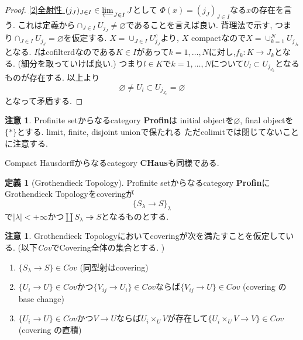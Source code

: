 \documentclass[dvipdfmx,a4paper,11pt]{report}
\theoremstyle{definition}
\newtheorem{dfn}[thm]{定義}
\newtheorem{rem}[thm]{注意}
\begin{document}
\begin{proof}
\underline{[2]全射性 }
$(j_{J})_{J \in I} \in \varprojlim_{J \in I} J$として
$\Phi(x) = (j_J)_{J \in I}$なる$x$の存在を言う.
これは定義から$\cap_{J \in I} U_{j_{J}} \neq \varnothing$であることを言えば良い.
背理法で示す, つまり$\cap_{J \in I} U_{j_{J}} = \varnothing$を仮定する.
$X = \cup_{J \in I} U_{j_{J}}^{c} $より, $X$ compactなので$X =\cup_{k=1}^{N}U_{j_{J_{k}}}$となる.
 $I$はcofilterdなのである$K \in I$があって$k = 1, \ldots, N$に対し,$f_{k} : K \to J_k$となる. (細分を取っていけば良い.)
つまり$l \in K$で$k = 1, \ldots, N$について$U_l\subset U_{j_{J_{k}}}$となるものが存在する.
以上より
 $$
\varnothing \neq U_l\subset U_{j_{J_{k}}} = \varnothing
 $$
 となって矛盾する.
\end{proof}

\begin{rem}
Profinite setからなるcategory {\bf Profin}は
initial objectを$\varnothing$, final objectを$\{ \ast\}$とする.
limit, finite, disjoint unionで保たれる
ただcolimitでは閉じてないことに注意する. 

Compact Hausdorffからなるcategory {\bf CHaus}も同様である. 
\end{rem}

\begin{tcolorbox}
 [colback = white, colframe = green!35!black, fonttitle = \bfseries,breakable = true]
\begin{dfn}[Grothendieck Topology]
Profinite setからなるcategory {\bf Profin}にGrothendieck Topologyをcoveringが
$$
\{ S_{\lambda} \to S\}_{\lambda}
$$ 
で$|\lambda| < + \infty$かつ$\coprod S_{\lambda} \twoheadrightarrow S$となるものとする.
\end{dfn}
 \end{tcolorbox}
 \begin{rem}
 Grothendieck Topologyにおいてcoveringが次を満たすことを仮定している. (以下\textit{Cov}でCovering全体の集合とする. )
 \begin{enumerate}
 \item $ \{ S_{\lambda} \to S\} \in \textit{Cov}$ (同型射はcovering)
 \item $\{U_i \to U\}\in \textit{Cov}$かつ$\{V_{ij} \to U_{i}\}\in \textit{Cov}$ならば$\{ V_{ij} \to U\} \in \textit{Cov}$ (covering のbase change)
 \item $\{U_i \to U\}\in \textit{Cov}$かつ$V \to U$ならば$U_{i} \times_{U}V$が存在して$\{ U_{i} \times_{U}V \to V\} \in \textit{Cov}$ (covering の直積)
 \end{enumerate} 
 \end{rem}
\end{document}
